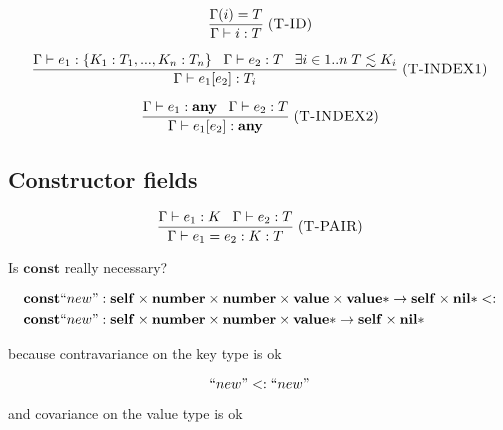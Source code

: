 \documentclass[12pt]{article}
\newcommand{\Top}{\mathbf{value}}
\newcommand{\Any}{\mathbf{any}}
\newcommand{\Nil}{\mathbf{nil}}
\newcommand{\Self}{\mathbf{self}}
\newcommand{\Number}{\mathbf{number}}
\newcommand{\Const}{\mathbf{const}}
\newcommand{\TopStar}{\Top{*}}
\newcommand{\NilStar}{\Nil{*}}
\newcommand{\mylabel}[1]{\; (\textsc{#1})}
\newcommand{\subtype}{<:}
\newcommand{\env}{\Gamma}
\begin{document}
\[
\frac{\env(i) = T}
     {\env \vdash i : T}
\mylabel{T-ID}
\]

\[
\frac{\env \vdash e_{1} : \{ K_{1}:T_{1}, ..., K_{n}:T_{n} \} \;\;\;
      \env \vdash e_{2} : T \;\;\;
      \exists i \in 1..n \; T \lesssim K_{i}}
     {\env \vdash e_{1}[e_{2}] : T_{i}}
\mylabel{T-INDEX1}
\]

\[
\frac{\env \vdash e_{1}:\Any \;\;\;
      \env \vdash e_{2}:T}
     {\env \vdash e_{1}[e_{2}] : \Any}
\mylabel{T-INDEX2}
\]

\subsection{Constructor fields}

\[
\frac{\env \vdash e_{1} : K \;\;\;
      \env \vdash e_{2} : T}
     {\env \vdash e_{1} = e_{2} : K:T}
\mylabel{T-PAIR}
\]

\newpage

\setlength{\oddsidemargin}{1mm}
\setlength{\evensidemargin}{1mm}
\setlength{\textwidth}{170mm}
\setlength{\marginparsep}{0mm}
\setlength{\marginparwidth}{0mm}

Is $\Const$ really necessary?

\[
\begin{aligned}
& \Const ``new":\Self \times \Number \times \Number \times \Top \times \TopStar \rightarrow \Self \times \NilStar \subtype \\
& \Const ``new":\Self \times \Number \times \Number \times \TopStar \rightarrow \Self \times \NilStar
\end{aligned}
\]

because contravariance on the key type is ok

\[
``new" \subtype ``new"
\]

and covariance on the value type is ok
\end{document}
